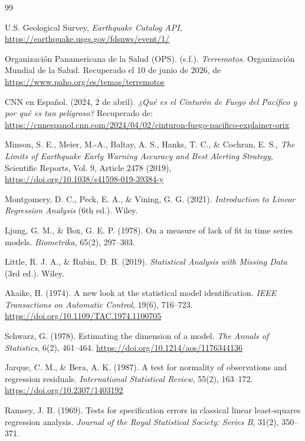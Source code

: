 \documentclass{style}
\begin{document}
\begin{thebibliography}{99}

U.S. Geological Survey, \textit{Earthquake Catalog API},\\
\url{https://earthquake.usgs.gov/fdsnws/event/1/}

Organización Panamericana de la Salud (OPS). (s.f.). \textit{Terremotos}. Organización Mundial de la Salud. Recuperado el 10 de junio de 2026, de \url{https://www.paho.org/es/temas/terremotos}

CNN en Español. (2024, 2 de abril). 
\textit{¿Qué es el Cinturón de Fuego del Pacífico y por qué es tan peligroso?} 
Recuperado de: \url{https://cnnespanol.cnn.com/2024/04/02/cinturon-fuego-pacifico-explainer-orix}

Minson, S. E., Meier, M.-A., Baltay, A. S., Hanks, T. C., \& Cochran, E. S.,
\textit{The Limits of Earthquake Early Warning Accuracy and Best Alerting Strategy},\\
Scientific Reports, Vol. 9, Article 2478 (2019),\\
\url{https://doi.org/10.1038/s41598-019-39384-y}

Montgomery, D. C., Peck, E. A., \& Vining, G. G. (2021).
\textit{Introduction to Linear Regression Analysis} (6th ed.). Wiley.

Ljung, G. M., \& Box, G. E. P. (1978). On a measure of lack of fit in time series models. \textit{Biometrika}, 65(2), 297--303.

Little, R. J. A., \& Rubin, D. B. (2019).
\textit{Statistical Analysis with Missing Data} (3rd ed.). Wiley.

Akaike, H. (1974). A new look at the statistical model identification. \textit{IEEE Transactions on Automatic Control}, 19(6), 716--723. \url{https://doi.org/10.1109/TAC.1974.1100705}

Schwarz, G. (1978). Estimating the dimension of a model. \textit{The Annals of Statistics}, 6(2), 461--464. \url{https://doi.org/10.1214/aos/1176344136}

Jarque, C. M., \& Bera, A. K. (1987). A test for normality of observations and regression residuals. \textit{International Statistical Review}, 55(2), 163--172. \url{https://doi.org/10.2307/1403192}

Ramsey, J. B. (1969). Tests for specification errors in classical linear least-squares regression analysis. \textit{Journal of the Royal Statistical Society: Series B}, 31(2), 350--371.


\end{thebibliography}
\end{document}
